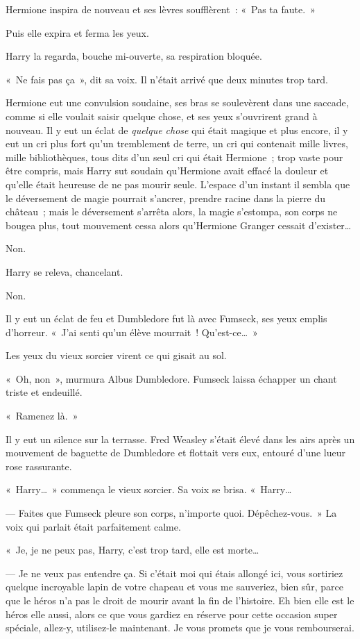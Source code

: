 Hermione inspira de nouveau et ses lèvres soufflèrent~: «~Pas ta faute.~»

Puis elle expira et ferma les yeux.

Harry la regarda, bouche mi-ouverte, sa respiration bloquée.

«~Ne fais pas ça~», dit sa voix. Il n'était arrivé que deux minutes trop tard.

Hermione eut une convulsion soudaine, ses bras se soulevèrent dans une saccade, comme si elle voulait saisir quelque chose, et ses yeux s'ouvrirent grand à nouveau. Il y eut un éclat de \emph{quelque chose} qui était magique et plus encore, il y eut un cri plus fort qu'un tremblement de terre, un cri qui contenait mille livres, mille bibliothèques, tous dits d'un seul cri qui était Hermione~; trop vaste pour être compris, mais Harry sut soudain qu'Hermione avait effacé la douleur et qu'elle était heureuse de ne pas mourir seule. L'espace d'un instant il sembla que le déversement de magie pourrait s'ancrer, prendre racine dans la pierre du château~; mais le déversement s'arrêta alors, la magie s'estompa, son corps ne bougea plus, tout mouvement cessa alors qu'Hermione Granger cessait d'exister…

Non.

Harry se releva, chancelant.

Non.

Il y eut un éclat de feu et Dumbledore fut là avec Fumseck, ses yeux emplis d'horreur. «~J'ai senti qu'un élève mourrait~! Qu'est-ce…~»

Les yeux du vieux sorcier virent ce qui gisait au sol.

«~Oh, non~», murmura Albus Dumbledore. Fumseck laissa échapper un chant triste et endeuillé.

«~Ramenez là.~»

Il y eut un silence sur la terrasse. Fred Weasley s'était élevé dans les airs après un mouvement de baguette de Dumbledore et flottait vers eux, entouré d'une lueur rose rassurante.

«~Harry…~» commença le vieux sorcier. Sa voix se brisa. «~Harry…

--- Faites que Fumseck pleure son corps, n'importe quoi. Dépêchez-vous.~» La voix qui parlait était parfaitement calme.

«~Je, je ne peux pas, Harry, c'est trop tard, elle est morte…

--- Je ne veux pas entendre ça. Si c'était moi qui étais allongé ici, vous sortiriez quelque incroyable lapin de votre chapeau et vous me sauveriez, bien sûr, parce que le héros n'a pas le droit de mourir avant la fin de l'histoire. Eh bien elle est le héros elle aussi, alors ce que vous gardiez en réserve pour cette occasion super spéciale, allez-y, utilisez-le maintenant. Je vous promets que je vous rembourserai.

